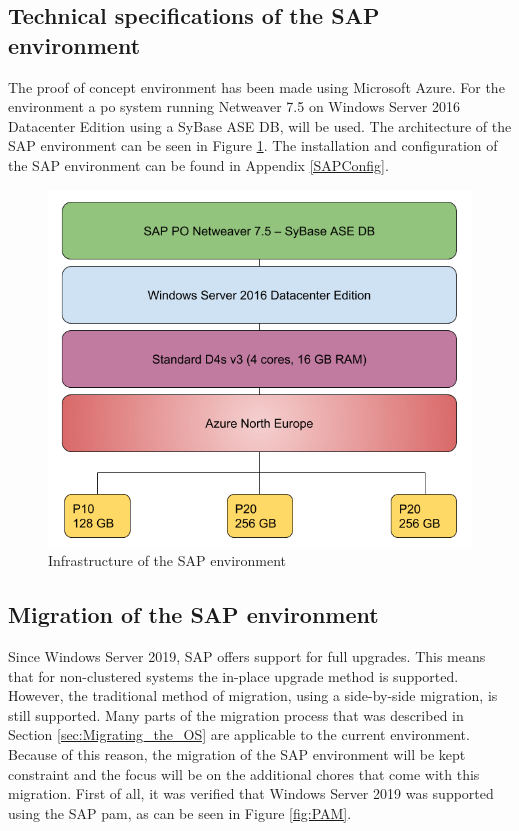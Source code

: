 \subsection{Technical specifications of the SAP environment}
The proof of concept environment has been made using Microsoft Azure. 
For the environment a \acrfull{po} system running Netweaver 7.5 on Windows Server 2016 Datacenter Edition using a SyBase ASE DB, will be used. 
The architecture of the SAP environment can be seen in Figure \ref{fig:SAPInfra}.
The installation and configuration of the SAP environment can be found in Appendix \ref{SAPConfig}.

\begin{figure}[h]
	\captionsetup{width=0.8\linewidth}
	\includegraphics[width=0.9\linewidth]{img/Methodologie/SAP_PO.png}
	\centering
	\caption[SAP Infrastructure]{Infrastructure of the SAP environment}
	\label{fig:SAPInfra}	
\end{figure}

\subsection{Migration of the SAP environment}
Since Windows Server 2019, SAP offers support for full upgrades. 
This means that for non-clustered systems the in-place upgrade method is supported.
However, the traditional method of migration, using a side-by-side migration, is still supported. 
Many parts of the migration process that was described in Section \ref{sec:Migrating_the_OS} are applicable to the current environment. 
Because of this reason, the migration of the SAP environment will be kept constraint and the focus will be on the additional chores that come with this migration.
First of all, it was verified that Windows Server 2019 was supported using the SAP \acrshort{pam}, as can be seen in Figure \ref{fig:PAM}.

